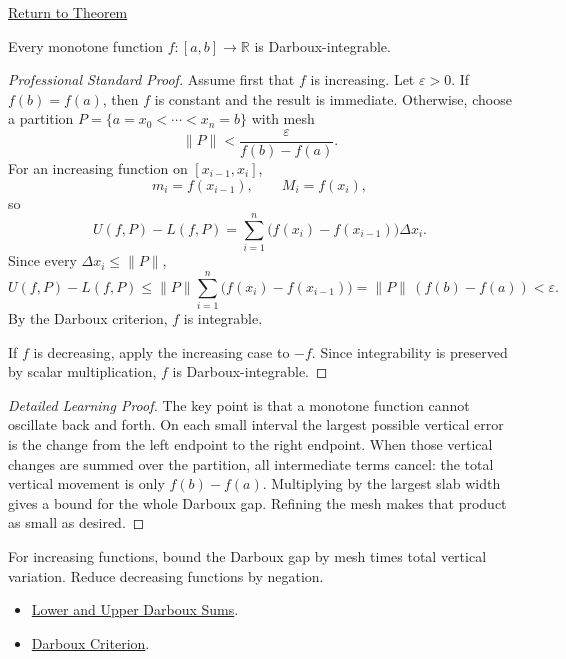 \newpage
{}
\label{prf:monotone-darboux-integrable}
\begin{remark*}[Return]\hyperref[thm:monotone-darboux-integrable]{Return to Theorem}\end{remark*}
\begin{theorem*}
Every monotone function \(f:[a,b]\to\mathbb R\) is Darboux-integrable.
\end{theorem*}
\begin{proof}[Professional Standard Proof]
\LRAProofBodyStart
Assume first that \(f\) is increasing. Let \(\varepsilon>0\). If
\(f(b)=f(a)\), then \(f\) is constant and the result is immediate. Otherwise,
choose a partition \(P=\{a=x_0<\cdots<x_n=b\}\) with mesh
\[
  \|P\|<\frac{\varepsilon}{f(b)-f(a)}.
\]
For an increasing function on \([x_{i-1},x_i]\),
\[
  m_i=f(x_{i-1}),\qquad M_i=f(x_i),
\]
so
\[
  U(f,P)-L(f,P)
  =
  \sum_{i=1}^n\bigl(f(x_i)-f(x_{i-1})\bigr)\Delta x_i.
\]
Since every \(\Delta x_i\le \|P\|\),
\[
  U(f,P)-L(f,P)
  \le
  \|P\|\sum_{i=1}^n\bigl(f(x_i)-f(x_{i-1})\bigr)
  =
  \|P\|\,(f(b)-f(a))
  <\varepsilon.
\]
By the Darboux criterion, \(f\) is integrable.

If \(f\) is decreasing, apply the increasing case to \(-f\). Since
integrability is preserved by scalar multiplication, \(f\) is Darboux-integrable.
\end{proof}
\begin{proof}[Detailed Learning Proof]
\LRAProofBodyStart
The key point is that a monotone function cannot oscillate back and forth.
On each small interval the largest possible vertical error is the change from
the left endpoint to the right endpoint. When those vertical changes are
summed over the partition, all intermediate terms cancel: the total vertical
movement is only \(f(b)-f(a)\). Multiplying by the largest slab width gives a
bound for the whole Darboux gap. Refining the mesh makes that product as small
as desired.
\end{proof}
\begin{remark*}
For increasing functions, bound the Darboux gap by mesh times total vertical
variation. Reduce decreasing functions by negation.
\end{remark*}
\begin{dependencies}
\begin{itemize}
  \item \hyperref[def:darboux-sums]{Lower and Upper Darboux Sums}.
  \item \hyperref[thm:darboux-criterion]{Darboux Criterion}.
\end{itemize}
\end{dependencies}
\clearpage

